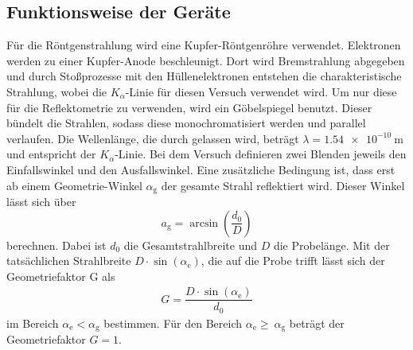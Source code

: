 \subsection{Funktionsweise der Geräte}
\label{sec:Geräte}
Für die Röntgenstrahlung wird eine Kupfer-Röntgenröhre verwendet. Elektronen werden zu einer Kupfer-Anode beschleunigt. Dort wird Bremstrahlung abgegeben und durch Stoßprozesse mit den Hüllenelektronen entstehen die charakteristische Strahlung, wobei die $K_\alpha$-Linie für diesen Versuch verwendet wird. Um nur diese für die Reflektometrie zu verwenden, wird ein Göbelspiegel benutzt. Dieser bündelt die Strahlen, sodass diese monochromatisiert werden und parallel verlaufen. Die Wellenlänge, die durch gelassen wird, beträgt $\lambda=\SI{1.54 e-10}{\meter}$ und entspricht der $K_\alpha$-Linie.
Bei dem Versuch definieren zwei Blenden jeweils den Einfallswinkel und den Ausfallswinkel. Eine zusätzliche Bedingung ist, dass erst ab einem Geometrie-Winkel $\alpha_\mathrm{g}$ der gesamte Strahl reflektiert wird. Dieser Winkel lässt sich über
\begin{equation}
  \label{eqn:Geometriewinkel}
a_\mathrm{g}=\arcsin\left(\dfrac{d_\mathrm{0}}{D}\right)
\end{equation}
berechnen. Dabei ist $d_\mathrm{0}$ die Gesamtstrahlbreite und $D$ die Probelänge. Mit der tatsächlichen Strahlbreite $D\cdot\sin(\alpha_\mathrm{e})$, die auf die Probe trifft lässt sich der Geometriefaktor G als
\begin{align}
  \label{eqn:Geometriefaktorl}
G= \dfrac{D\cdot\sin(\alpha_\mathrm{e})}{d_\mathrm{0}}
\end{align}
im Bereich $ \alpha_\mathrm{e}< \alpha_\mathrm{g}$ bestimmen. Für den Bereich $\alpha_\mathrm{e}\geq\ \alpha_\mathrm{g}$ beträgt der Geometriefaktor $G=1$.
